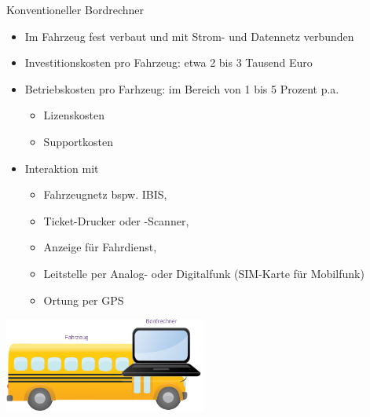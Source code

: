 
\begin{frame}{Konventioneller Bordrechner}
  \begin{itemize}
  \item Im Fahrzeug fest verbaut und mit Strom- und Datennetz verbunden
  \item Investitionskosten pro Fahrzeug: etwa 2 bis 3 Tausend Euro
  \item Betriebskosten pro Farhzeug: im Bereich von 1 bis 5 Prozent p.a.
    \begin{itemize}
    \item Lizenskosten
    \item Supportkosten
    \end{itemize}
  \item Interaktion mit
    \begin{itemize}
    \item Fahrzeugnetz bspw. IBIS,
    \item Ticket-Drucker oder -Scanner,
    \item Anzeige für Fahrdienst,
    \item Leitstelle per Analog- oder Digitalfunk (SIM-Karte für Mobilfunk)
    \item Ortung per GPS
    \end{itemize}
  \end{itemize}
  \includegraphics[width=0.5\textwidth]{otm-june-2-2021/bus.png}
\end{frame}

